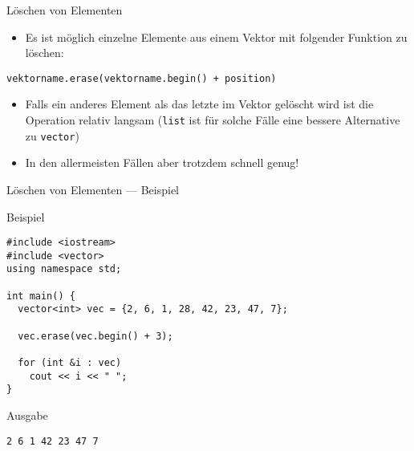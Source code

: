 \documentclass[presentation]{beamer}
\begin{document}
\begin{frame}[label={sec:orgef98064},fragile]{Löschen von Elementen}
 \begin{itemize}
\item Es ist möglich \alert{einzelne Elemente} aus einem Vektor mit folgender
Funktion zu \alert{löschen}:
\end{itemize}
{\color{solarizedYellow}\verb!vektorname.erase(vektorname.begin() + position)!}
\begin{itemize}
\item Falls ein anderes Element als das letzte im Vektor gelöscht wird ist
die Operation \alert{relativ langsam} ({\color{solarizedYellow}\verb!list!} ist für solche Fälle eine
bessere Alternative zu {\color{solarizedYellow}\verb!vector!})
\item In den allermeisten Fällen aber trotzdem \alert{schnell genug}!
\end{itemize}
\end{frame}

\begin{frame}[label={sec:org61b20a4},fragile]{Löschen von Elementen --- Beispiel}
 \begin{block}{Beispiel}
\begin{verbatim}
#include <iostream>
#include <vector>
using namespace std;

int main() {
  vector<int> vec = {2, 6, 1, 28, 42, 23, 47, 7};

  vec.erase(vec.begin() + 3);

  for (int &i : vec)
    cout << i << " ";
}
\end{verbatim}
\end{block}

\begin{block}{Ausgabe}
\begin{verbatim}
2 6 1 42 23 47 7
\end{verbatim}
\end{block}
\end{frame}
\end{document}
